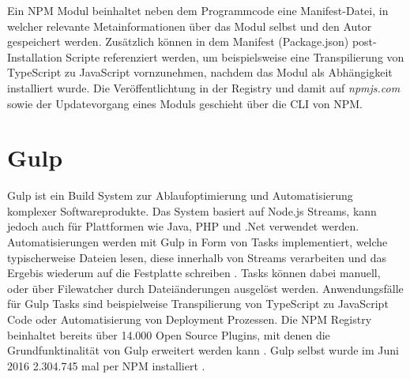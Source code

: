 Ein \ac{NPM} Modul beinhaltet neben dem Programmcode eine Manifest-Datei, in welcher relevante Metainformationen über das Modul selbst und den Autor gespeichert werden.
Zusätzlich können in dem Manifest (Package.json) post-Installation Scripte referenziert werden, um
beispielsweise eine Transpilierung von TypeScript zu JavaScript vornzunehmen, nachdem das Modul als Abhängigkeit installiert wurde.
Die Veröffentlichtung in der Registry und damit auf \emph{npmjs.com} sowie der Updatevorgang eines Moduls geschieht über die \ac{CLI} von \ac{NPM}.

\section{Gulp}

Gulp ist ein Build System zur Ablaufoptimierung und Automatisierung komplexer Softwareprodukte.
Das System basiert auf Node.js Streams, kann jedoch auch für Plattformen wie Java, PHP und .Net verwendet werden.
Automatisierungen werden mit Gulp in Form von Tasks implementiert,
welche typischerweise Dateien lesen, diese innerhalb von Streams verarbeiten und das Ergebis wiederum auf die
Festplatte schreiben \cite{gulpj46:online}.
Tasks können dabei manuell, oder über Filewatcher durch Dateiänderungen ausgelöst werden.
Anwendungsfälle für Gulp Tasks sind beispielweise Transpilierung von TypeScript zu JavaScript Code oder
Automatisierung von Deployment Prozessen. Die \ac{NPM} Registry beinhaltet bereits über 14.000 Open Source Plugins,
mit denen die Grundfunktinalität von Gulp erweitert werden kann \cite{resul14:online}.
Gulp selbst wurde im Juni 2016 2.304.745 mal per NPM installiert \cite{gulp17:online}.
